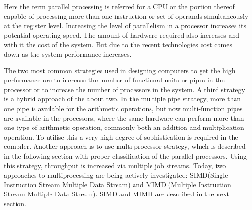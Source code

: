 Here the term parallel processing is referred for a CPU or the portion thereof capable of processing more than one instruction or set of operands
simultaneously at the register level. Increasing the level of parallelism in a processor increases its potential operating speed. The amount of hardware
required also increases and with it the cost of the system. But due to the recent technologies cost comes down as the system performance increases.\par
\hspace{1in} The two most common strategies used in designing computers to get the high performance are to increase the number of functional units or pipes in
the processor or to increase the number of processors in the system. A third strategy is a hybrid approach of the about two. In the multiple pipe strategy,
more than one pipe is available for the arithmetic operations, but now multi-function pipes are available in the processors, where the same hardware
can perform more than one type of arithmetic operation, commonly both an addition and multiplication operation. To utilise this a very high degree of
sophistication is required in the compiler. Another approach is to use multi-processor strategy, which is described in the following section with proper
classification of the parallel processors. Using this strategy, throughput is increased via multiple job streams. Today, two approaches to
multiprocessing are being actively investigated: SIMD(Single Instruction Stream Multiple Data Stream)  and MIMD (Multiple Instruction Stream Multiple Data
Stream). SIMD and MIMD are described in the next section.  

